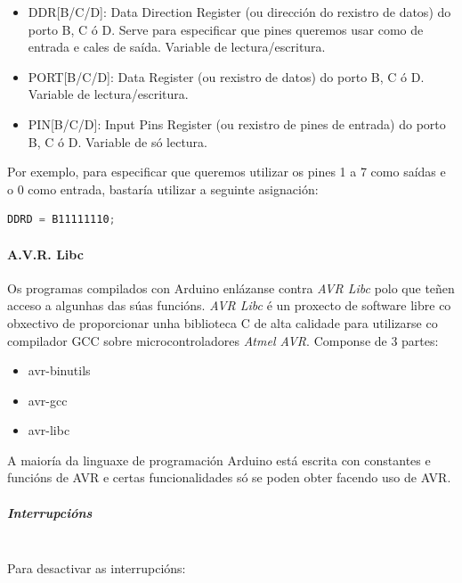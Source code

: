     \begin{itemize}
     \item DDR[B/C/D]: Data Direction Register (ou dirección do rexistro de
           datos) do porto B, C ó D. Serve para especificar que pines queremos
           usar como de entrada e cales de saída. Variable de
           lectura/escritura.
     \item PORT[B/C/D]: Data Register (ou rexistro de datos) do porto B, C ó D.
           Variable de lectura/escritura.
     \item PIN[B/C/D]: Input Pins Register (ou rexistro de pines de entrada) do
           porto B, C ó D. Variable de só lectura.
    \end{itemize}

    Por exemplo, para especificar que queremos utilizar os pines 1 a 7 como
    saídas e o 0 como entrada, bastaría utilizar a seguinte asignación: \\

    \begin{lstlisting}[language=C++,frame=single]
     DDRD = B11111110;
    \end{lstlisting}

   \paragraph{A.V.R. Libc}

   Os programas compilados con Arduino enlázanse contra \textit{AVR Libc} polo
   que teñen acceso a algunhas das súas funcións. \textit{AVR Libc} é un
   proxecto de software libre co obxectivo de proporcionar unha biblioteca C de
   alta calidade para utilizarse co compilador GCC sobre microcontroladores
   \textit{Atmel AVR}. Componse de 3 partes:

   \begin{itemize}
    \item avr-binutils
    \item avr-gcc
    \item avr-libc
   \end{itemize}

   A maioría da linguaxe de programación Arduino está escrita con constantes e
   funcións de AVR e certas funcionalidades só se poden obter facendo uso de
   AVR.

    \subparagraph{Interrupcións}\mbox{}\\

    Para desactivar as interrupcións: \\

